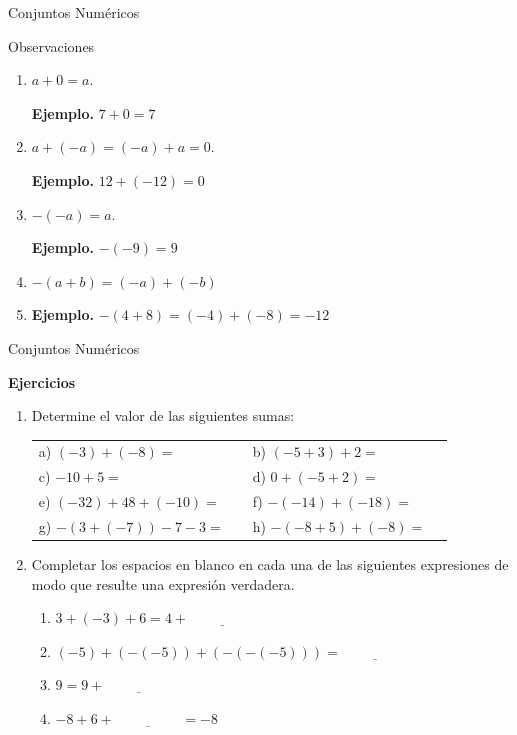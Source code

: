 \documentclass[handout,10pt]{beamer}
\begin{document}
	\begin{frame}{Conjuntos Numéricos}
		\begin{block}{Observaciones}
			\begin{enumerate}
				\item $a+0=a$.
				
				\textbf{Ejemplo.} $7+0=7$
				\pause
				
				\item $a+(-a)=(-a)+a=0$.
				
				\textbf{Ejemplo.} $12+(-12)=0$
				\pause
				
				\item $-(-a)=a$.
				
				\textbf{Ejemplo.} $-(-9)=9$
				\pause
				
				\item $-(a+b)=(-a)+(-b)$
				\pause
				
				\item \textbf{Ejemplo.} $-(4+8)=(-4)+(-8)=-12$
			\end{enumerate}
		\end{block}
	\end{frame}
	
	\begin{frame}{Conjuntos Numéricos}
		\begin{block}{}
			\textbf{Ejercicios}
			
			\begin{enumerate}
				\item Determine el valor de las siguientes sumas:
				
				\begin{tabular}{llll}
					a) $(-3)+(-8)=$\pause &  & b) $(-5+3)+2=$\pause &  \\
					c) $-10+5=$\pause &  & d) $0+(-5+2)=$\pause &  \\
					e) $(-32)+48+(-10)=$\pause &  & f) $-(-14)+(-18)=$\pause &  \\
					g) $-(3+(-7))-7-3=$\pause &  & h) $-(-8+5)+(-8)=$ & 
				\end{tabular}
				
				\item Completar los espacios en blanco en cada una de las siguientes expresiones de modo que resulte una expresión verdadera.
				
				\begin{enumerate}
					\item $3+(-3)+6=4+\underline{\hspace{2cm}}$
					\pause
					\item $(-5)+(-(-5))+(-(-(-5)))=\underline{\hspace{2cm}}$
					\pause
					\item $9=9+\underline{\hspace{2cm}}$
					\pause
					\item $-8+6+\underline{\hspace{2cm}}=-8$
				\end{enumerate}
			\end{enumerate}
		\end{block}
	\end{frame}
	
\end{document}
